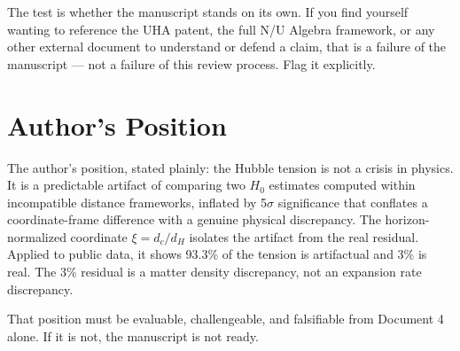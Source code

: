 \documentclass[12pt,a4paper]{article}
\begin{document}
The test is whether the manuscript stands on its own. If you find
yourself wanting to reference the UHA patent, the full N/U Algebra
framework, or any other external document to understand or defend
a claim, that is a failure of the manuscript --- not a failure of
this review process. Flag it explicitly.

\section*{Author's Position}

The author's position, stated plainly: the Hubble tension is not a
crisis in physics. It is a predictable artifact of comparing two
$H_0$ estimates computed within incompatible distance frameworks,
inflated by 5$\sigma$ significance that conflates a coordinate-frame
difference with a genuine physical discrepancy. The horizon-normalized
coordinate $\xi = d_c/d_H$ isolates the artifact from the real
residual. Applied to public data, it shows 93.3\% of the tension is
artifactual and 3\% is real. The 3\% residual is a matter density
discrepancy, not an expansion rate discrepancy.

That position must be evaluable, challengeable, and falsifiable
from Document 4 alone. If it is not, the manuscript is not ready.
\end{document}
